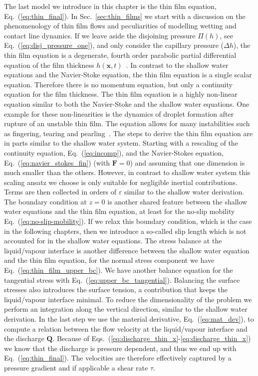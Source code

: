 The last model we introduce in this chapter is the thin film equation, Eq.~(\ref{eq:thin_final}). 
In Sec.~\ref{sec:thin_films} we start with a discussion on the phenomenology of thin film flows and peculiarities of modelling wetting and contact line dynamics.
If we leave aside the disjoining pressure $\Pi(h)$, see Eq.~(\ref{eq:disj_pressure_one}), and only consider the capillary pressure ($\Delta h$), the thin film equation is a degenerate, fourth order parabolic partial differential equation of the film thickness $h(\mathbf{x},t)$~\cite{peschkaVariationalApproachDynamic2018}.
In contrast to the shallow water equations and the Navier-Stoke equation, the thin film equation is a single scalar equation.
Therefore there is no momentum equation, but only a continuity equation for the film thickness.
The thin film equation is a highly non-linear equation similar to both the Navier-Stoke and the shallow water equations. 
One example for these non-linearities is the dynamics of droplet formation after rupture of an unstable thin film. 
The equation allows for many instabilities such as fingering, tearing and pearling~\cite{crasterDynamicsStabilityThin2009, wilczekSlidingDropsEnsemble2017}. 
The steps to derive the thin film equation are in parts similar to the shallow water system.
Starting with a rescaling of the continuity equation, Eq.~(\ref{eq:incomp}), and the Navier-Stokes equation, Eq.~(\ref{eq:navier_stokes_fin}) (with $\mathbf{F} = 0$) and assuming that one dimension is much smaller than the others. 
However, in contrast to shallow water system this scaling ansatz we choose is only suitable for negligible inertial contributions.
Terms are then collected in orders of $\varepsilon$ similar to the shallow water derivation.
The boundary condition at $z=0$ is another shared feature between the shallow water equations and the thin film equation, at least for the no-slip mobility Eq.~(\ref{eq:no-slip-mobility}).
If we relax this boundary condition, which is the case in the following chapters, then we introduce a so-called slip length which is not accounted for in the shallow water equations.
The stress balance at the liquid/vapour interface is another difference between the shallow water equation and the thin film equation, for the normal stress component we have Eq.~(\ref{eq:thin_film_upper_bc}).
We have another balance equation for the tangential stress with Eq.~(\ref{eq:upper_bc_tangential}).
Balancing the surface stresses also introduces the surface tension, a contribution that keeps the liquid/vapour interface minimal.  
To reduce the dimensionality of the problem we perform an integration along the vertical direction, similar to the shallow water derivation.
In the last step we use the material derivative, Eq.~(\ref{eq:mat_dev}), to compute a relation between the flow velocity at the liquid/vapour interface and the discharge $\mathbf{Q}$.
Because of Eqs.~(\ref{eq:discharge_thin_x}-\ref{eq:discharge_thin_x}) we know that the discharge is pressure dependent, and thus we end up with Eq.~(\ref{eq:thin_final}).
The velocities are therefore effectively captured by a pressure gradient and if applicable a shear rate $\tau$.

